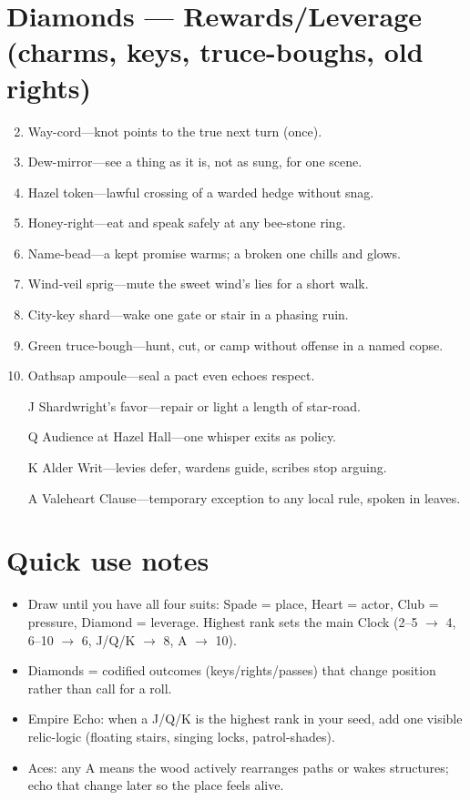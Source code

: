 \section*{Diamonds --- Rewards/Leverage (charms, keys, truce-boughs, old rights)}
\begin{enumerate}
\setcounter{enumi}{1}
\item Way-cord---knot points to the true next turn (once).
\item Dew-mirror---see a thing as it is, not as sung, for one scene.
\item Hazel token---lawful crossing of a warded hedge without snag.
\item Honey-right---eat and speak safely at any bee-stone ring.
\item Name-bead---a kept promise warms; a broken one chills and glows.
\item Wind-veil sprig---mute the sweet wind's lies for a short walk.
\item City-key shard---wake one gate or stair in a phasing ruin.
\item Green truce-bough---hunt, cut, or camp without offense in a named copse.
\item Oathsap ampoule---seal a pact even echoes respect.
\item[J] Shardwright's favor---repair or light a length of star-road.
\item[Q] Audience at Hazel Hall---one whisper exits as policy.
\item[K] Alder Writ---levies defer, wardens guide, scribes stop arguing.
\item[A] Valeheart Clause---temporary exception to any local rule, spoken in leaves.
\end{enumerate}

\section*{Quick use notes}
\begin{itemize}
\item Draw until you have all four suits: Spade = place, Heart = actor, Club = pressure, Diamond = leverage. Highest rank sets the main Clock (2--5 $\rightarrow$ 4, 6--10 $\rightarrow$ 6, J/Q/K $\rightarrow$ 8, A $\rightarrow$ 10).
\item Diamonds = codified outcomes (keys/rights/passes) that change position rather than call for a roll.
\item Empire Echo: when a J/Q/K is the highest rank in your seed, add one visible relic-logic (floating stairs, singing locks, patrol-shades).
\item Aces: any A means the wood actively rearranges paths or wakes structures; echo that change later so the place feels alive.
\end{itemize}
